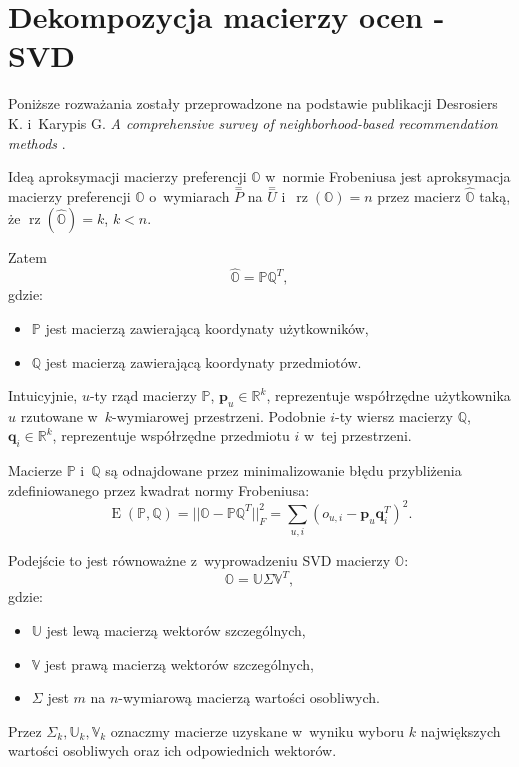 \documentclass[12pt,a4paper]{report}
\newcommand{\setR}{\mathbb{R}}
\newcommand{\rz}[1]{\operatorname{rz}\left({#1} \right)}
\newcommand{\e}[1]{\operatorname{E}\left({#1} \right)}
\begin{document}
\section{Dekompozycja macierzy ocen - SVD}
Poniższe rozważania zostały przeprowadzone na podstawie publikacji Desrosiers K. i~Karypis G. \textit{A comprehensive survey of neighborhood-based recommendation methods} {\citep[Sec 4.1.1]{acsonbrs}}.

Ideą aproksymacji macierzy preferencji $\mathbb{O}$ w~normie Frobeniusa jest aproksymacja macierzy preferencji $\mathbb{O}$ o~wymiarach $\mathit{\stackrel{=}{P}}$ na $\stackrel{=}{\mathit{U}}$ i~$\rz{\mathbb{O}} = n$ przez macierz $\widehat{\mathbb{O}}$ taką, że $\rz{\widehat{\mathbb{O}}} = k$, $k<n$. 

Zatem
$$
\widehat{\mathbb{O}} = \mathbb{P}\mathbb{Q}^T,
$$
gdzie:
\begin{itemize}
\item $\mathbb{P}$ jest macierzą zawierającą koordynaty użytkowników,
\item $\mathbb{Q}$ jest macierzą zawierającą koordynaty przedmiotów.
\end{itemize}

Intuicyjnie, $u$-ty rząd macierzy $\mathbb{P}$, $\mathbf{p}_u \in \setR^k$, reprezentuje współrzędne użytkownika $u$ rzutowane w~$k$-wymiarowej przestrzeni. Podobnie $i$-ty wiersz macierzy $\mathbb{Q}$, $\mathbf{q}_i \in \setR^k$, reprezentuje współrzędne przedmiotu $i$ w~tej przestrzeni.

Macierze $\mathbb{P}$ i~$\mathbb{Q}$ są odnajdowane przez minimalizowanie błędu przybliżenia zdefiniowanego przez kwadrat normy Frobeniusa:
$$
\e{\mathbb{P}, \mathbb{Q}} = ||\mathbb{O}-\mathbb{P} \mathbb{Q}^T||_F^2 = \sum_{u,i}(o_{u,i} - \mathbf{p}_u\mathbf{q}_i^T)^2.
$$

Podejście to jest równoważne z~wyprowadzeniu SVD macierzy $\mathbb{O}$:
$$
\mathbb{O} = \mathbb{U} \Sigma \mathbb{V}^T,
$$
gdzie:
\begin{itemize}
\item $\mathbb{U}$ jest lewą macierzą wektorów szczególnych,
\item $\mathbb{V}$ jest prawą macierzą wektorów szczególnych,
\item $\Sigma$ jest $m$ na $n$-wymiarową macierzą wartości osobliwych.
\end{itemize}

Przez $\Sigma_k, \mathbb{U}_k, \mathbb{V}_k$ oznaczmy macierze uzyskane w~wyniku wyboru $k$ największych wartości osobliwych oraz ich odpowiednich wektorów. 
\end{document}
